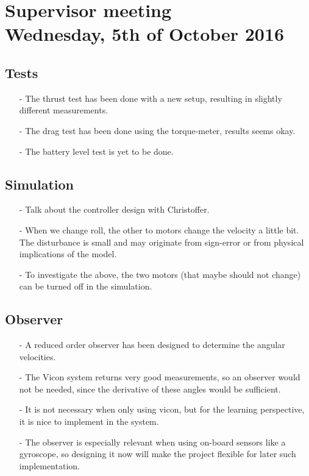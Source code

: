 
\renewcommand{\vec}[1]{\boldsymbol{\mathbf{#1}}}

\renewcommand\chaptername{KAPITEL}
\renewcommand\contentsname{Indhold}
\renewcommand\figurename{Figur}
\renewcommand\tablename{Tabel}

\section*{Supervisor meeting\\ \small Wednesday, 5th of October 2016}

\subsection{Tests}
\begin{itemize}
  \item[-] The thrust test has been done with a new setup, resulting in slightly different measurements.
  \item[-] The drag test has been done using the torque-meter, results seems okay.
  \item[-] The battery level test is yet to be done.
\end{itemize}

\subsection{Simulation}
\begin{itemize}
  \item[-] Talk about the controller design with Christoffer.
  \item[-] When we change roll, the other to motors change the velocity a little bit. The disturbance is small and may originate from sign-error or from physical implications of the model.
  \item[-] To investigate the above, the two motors (that maybe should not change) can be turned off in the simulation.
\end{itemize}

\subsection{Observer}
\begin{itemize}
  \item[-] A reduced order observer has been designed to determine the angular velocities.
  \item[-] The Vicon system returns very good measurements, so an observer would not be needed, since the derivative of these angles would be sufficient.
  \item[-] It is not necessary when only using vicon, but for the learning perspective, it is nice to implement in the system.
  \item[-] The observer is especially relevant when using on-board sensors like a gyroscope, so designing it now will make the project flexible for later such implementation.
\end{itemize}


